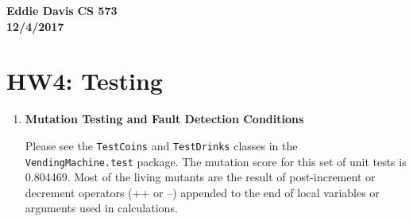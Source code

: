 \documentclass{report}
\begin{document}
\textbf{Eddie Davis}
\textbf{CS 573}\\
\textbf{12/4/2017}\\

\section*{HW4: Testing}

\begin{enumerate}
	\item \textbf{Mutation Testing and Fault Detection Conditions}

	Please see the \texttt{TestCoins} and \texttt{TestDrinks} classes in the
	\texttt{VendingMachine.test} package.
	The mutation score for this set of unit tests is 0.804469.
	Most of the living mutants are the result of post-increment or decrement operators (++ or --) appended
	to the end of local variables or arguments used in calculations.


\end{enumerate}
\end{document}
